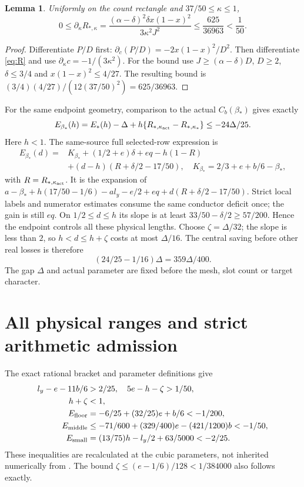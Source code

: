 \documentclass[11pt,a4paper]{article}
\newtheorem{lemma}[theorem]{Lemma}
\theoremstyle{definition}
\newcommand{\bet}{\beta_*}
\begin{document}
\begin{lemma}\label{lem:derivative}
Uniformly on the count rectangle and $37/50\le\kappa\le1$,
\[
 0\le\partial_\kappa R_{*,\kappa}
 =\frac{(\alpha-\delta)^2\delta x(1-x)^2}{3\kappa^2J^2}
 \le\frac{625}{36963}<\frac1{50}.
\]
\end{lemma}
\begin{proof}
Differentiate $P/D$ first:
$\partial_c(P/D)=-2x(1-x)^2/D^2$.
Then differentiate \eqref{eq:R} and use
$\partial_\kappa c=-1/(3\kappa^2)$.
For the bound use $J\ge(\alpha-\delta)D$, $D\ge2$,
$\delta\le3/4$ and $x(1-x)^2\le4/27$.
The resulting bound is
$(3/4)(4/27)/(12(37/50)^2)=625/36963$.
\end{proof}

For the same endpoint geometry, comparison to the actual
$C_b(\bet)$ gives exactly
\[
 E_{\bet}(h)=E_*(h)-\Delta+
 h\{R_{*,\kappa_{\rm act}}-R_{*,\kappa_*}\}
 \le-24\Delta/25 .
\]
Here $h<1$. The same-source full selected-row expression is
\begin{equation}\label{eq:fullE}
\begin{split}
 E_{\bet}(d)={}&K_{\bet}+(1/2+e)\delta+eq
             -h(1-R)\\
 &+(d-h)(R+\delta/2-17/50),\quad
 K_{\bet}=2/3+e+b/6-\bet ,
\end{split}
\end{equation}
with $R=R_{*,\kappa_{\rm act}}$.
It is the expansion of
$a-\bet+h(17/50-1/6)-a l_y-e/2+eq
 +d(R+\delta/2-17/50)$.
Strict local labels and numerator estimates consume the same
conductor deficit once; the gain is still $eq$.
On $1/2\le d\le h$ its slope is at least
$33/50-\delta/2\ge57/200$.
Hence the endpoint controls all these physical lengths.
Choose $\zeta=\Delta/32$; the slope is less than $2$,
so $h<d\le h+\zeta$ costs at most $\Delta/16$.
The central saving before other real losses is therefore
\begin{equation}\label{eq:saving}
 (24/25-1/16)\Delta=359\Delta/400.
\end{equation}
The gap $\Delta$ and actual parameter are fixed before the
mesh, slot count or target character.

\section{All physical ranges and strict arithmetic admission}
\label{sec:admission}
The exact rational bracket and parameter definitions give
\begin{align}
 l_y-e-11b/6&>2/25,\quad
 5e-h-\zeta>1/50,\label{eq:geometrymargins}\\
 h+\zeta&<1,\notag\\
 E_{\rm floor}&=-6/25+(32/25)e+b/6<-1/200,\notag\\
 E_{\rm middle}&\le-71/600+(329/400)e-(421/1200)b<-1/50,\notag\\
 E_{\rm small}&=(13/75)h-l_y/2+63/5000<-2/25.\label{eq:ranges}
\end{align}
These inequalities are recalculated at the cubic parameters,
not inherited numerically from \cite{FreeB}.
The bound
$\zeta\le(e-1/6)/128<1/384000$
also follows exactly.
\end{document}
